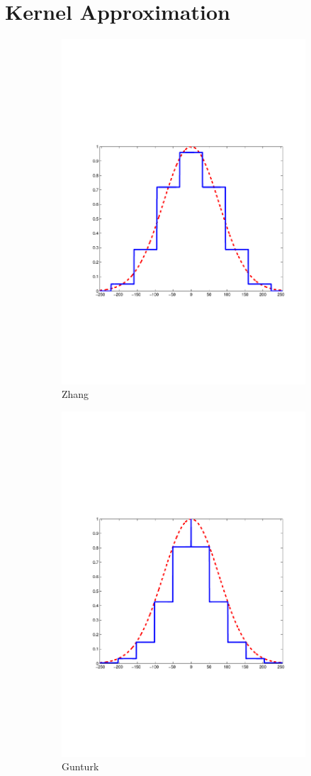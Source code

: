 \documentclass[twocolumn]{el-author}
\begin{document}
\section{Kernel Approximation}


\begin{figure}[t]
\centering
\begin{subfigure}[b]{0.32\linewidth}
    \centering
    \includegraphics[width=\linewidth, height= 0.6\linewidth]{zhang1}
    \caption{Zhang~\cite{Zhang_2012_TIP}}
    \label{fig:minimax_path:path}
\end{subfigure}
\hfill
\begin{subfigure}[b]{0.32\linewidth}
    \centering
    \includegraphics[width=\linewidth, height= 0.6\linewidth]{Gunturk1}
    \caption{Gunturk~\cite{Gunturk_TIP_2011}}
    \label{fig:minimax_path:path}
\end{subfigure}
\hfill
\begin{subfigure}[b]{0.32\linewidth}
    \centering

\end{subfigure}
\end{figure}
\end{document}
